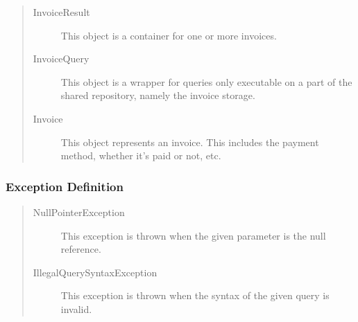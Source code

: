 \begin{quote}
	\begin{description}
		\item[InvoiceResult] This object is a container for one or more invoices. 
		\item[InvoiceQuery] This object is a wrapper for queries only executable on a
		part of the shared repository, namely the invoice storage.
		\item[Invoice] This object represents an invoice. This includes the payment
		method, whether it's paid or not, etc.
	\end{description} 
\end{quote}

\subsubsection{Exception Definition} 

\begin{quote}
	\begin{description}
		\item[NullPointerException] This exception is thrown when the given parameter
		is the null reference.
		\item[IllegalQuerySyntaxException] This exception is thrown when the syntax of
		the given query is invalid.
	\end{description} 
\end{quote}